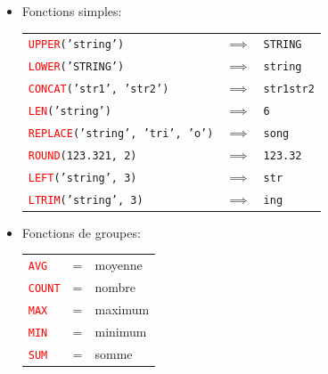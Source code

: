 \documentclass[a4paper]{article}
\begin{document}
\begin{itemize}



\item Fonctions simples:
\begin{center}
    \begin{tabular}{lll}
        \texttt{\textcolor{red}{UPPER}('string')}               & $ \implies $ & \texttt{STRING} \\
        \texttt{\textcolor{red}{LOWER}('STRING')}               & $ \implies $ & \texttt{string} \\
        \texttt{\textcolor{red}{CONCAT}('str1', 'str2')}        & $ \implies $ & \texttt{str1str2} \\
        \texttt{\textcolor{red}{LEN}('string')}                 & $ \implies $ & \texttt{6} \\
        \texttt{\textcolor{red}{REPLACE}('string', 'tri', 'o')} & $ \implies $ & \texttt{song} \\
        \texttt{\textcolor{red}{ROUND}(123.321, 2)}             & $ \implies $ & \texttt{123.32} \\
        \texttt{\textcolor{red}{LEFT}('string', 3)}             & $ \implies $ & \texttt{str} \\
        \texttt{\textcolor{red}{LTRIM}('string', 3)}            & $ \implies $ & \texttt{ing} \\
    \end{tabular}
\end{center}



\item Fonctions de groupes:
\begin{center}
    \begin{tabular}{lll}
        \texttt{\textcolor{red}{AVG}}   & = & moyenne \\
        \texttt{\textcolor{red}{COUNT}} & = & nombre \\
        \texttt{\textcolor{red}{MAX}}   & = & maximum \\
        \texttt{\textcolor{red}{MIN}}   & = & minimum \\
        \texttt{\textcolor{red}{SUM}}   & = & somme \\
    \end{tabular}
\end{center}



\end{itemize}
\end{document}
